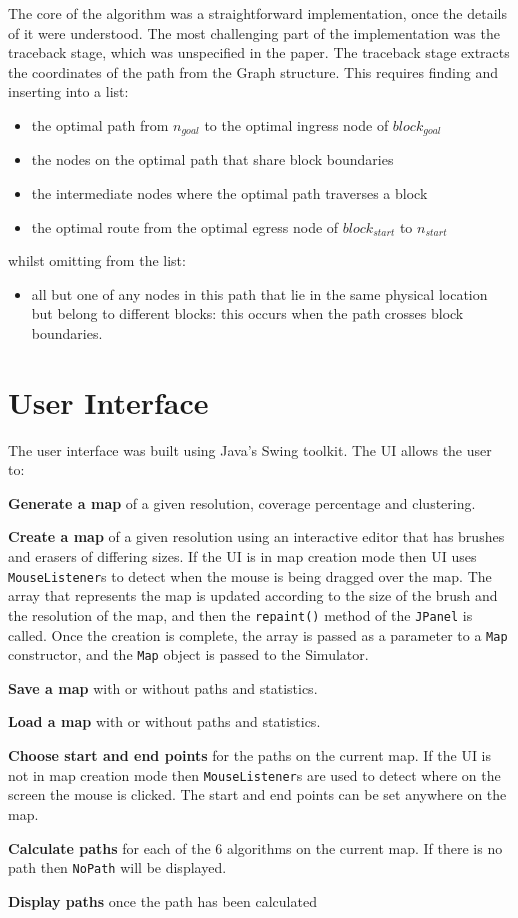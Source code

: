 \documentclass[12pt,notitlepage]{report}
\begin{document}
\noindent
The core of the algorithm was a straightforward implementation, once the details of it were understood. The most challenging part of the implementation was the traceback stage, which was unspecified in the paper. The traceback stage extracts the coordinates of the path from the Graph structure. This requires finding and inserting into a list:
\begin{itemize}
\item the optimal path from $n_{goal}$ to the optimal ingress node of $block_{goal}$
\item the nodes on the optimal path that share block boundaries
\item the intermediate nodes where the optimal path traverses a block
\item the optimal route from the optimal egress node of $block_{start}$ to $n_{start}$
\end{itemize}
\noindent
whilst omitting from the list:
\begin{itemize}
\item all but one of any nodes in this path that lie in the same physical location but belong to different blocks: this occurs when the path crosses block boundaries.
\end{itemize}
 
\section{User Interface}

The user interface was built using Java's Swing toolkit. The UI allows the user to:
\begin{description}
\item{\bf Generate a map} of a given resolution, coverage percentage and clustering.
\item{\bf Create a map} of a given resolution using an interactive editor that has brushes and erasers of differing sizes. If the UI is in map creation mode then UI uses {\tt MouseListener}s to detect when the mouse is being dragged over the map. The array that represents the map is updated according to the size of the brush and the resolution of the map, and then the {\tt repaint()} method of the {\tt JPanel} is called. Once the creation is complete, the array is passed as a parameter to a {\tt Map} constructor, and the {\tt Map} object is passed to the Simulator.
\item{\bf Save a map} with or without paths and statistics.
\item{\bf Load a map} with or without paths and statistics.
\item{\bf Choose start and end points} for the paths on the current map. If the UI is not in map creation mode then {\tt MouseListener}s are used to detect where on the screen the mouse is clicked. The start and end points can be set anywhere on the map.
\item{\bf Calculate paths} for each of the 6 algorithms on the current map. If there is no path then {\tt NoPath} will be displayed.
\item{\bf Display paths} once the path has been calculated
\end{description}
\end{document}
